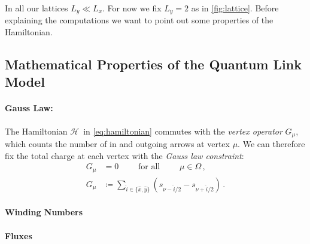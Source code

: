 \documentclass[12pt, a4paper, twoside, titlepage]{article}
\renewcommand{\H}{\ensuremath{\mathcal{H}}}
\begin{document}
In all our lattices $L_y \ll L_x$. For now we fix $L_y = 2$ as in \cref{fig:lattice}.
Before explaining the computations we want to point out some properties of the Hamiltonian.

\subsection{Mathematical Properties of the Quantum Link Model}
\paragraph{Gauss Law:}
The Hamiltonian \H\, in \cref{eq:hamiltonian} 
commutes with the \textit{vertex operator} $G_\mu$, which counts the number of in and
outgoing arrows at vertex $\mu$. We can therefore fix the total charge at each vertex
with the \textit{Gauss law constraint}:
\begin{align}\label{eq:ice_rule}
  G_\mu&=0 \qquad\text{ for all }\qquad \mu \in \Omega\,,\\
  G_\mu &\coloneqq \sum_{\hat{i}\in\{\hat{x},\hat{y}\}} ( s_{\nu-\hat{i}/2}-s_{\nu+\hat{i}/2})\,.
\end{align}
\paragraph{Winding Numbers}

\paragraph{Fluxes}
\end{document}
